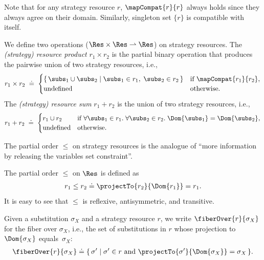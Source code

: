 Note that for any strategy resource $r$, $\mapCompat{r}{r}$ always holds since they always agree on their domain. Similarly, singleton set $\{r\}$ is compatible with itself.

\begin{definition}\label{def:strategy-resource-times} We define two operations ($\Res \times \Res \rightharpoonup \Res$) on strategy resources. The \emph{(strategy) resource product} $r_1 \times r_2$ is the partial binary operation that produces the pairwise union of two strategy resources, i.e.,
  \[
    r_1 \times r_2 \;\doteq\;
    \begin{cases}
      \{\, \subs_1 \cup \subs_2 \mid \subs_1 \in r_1,\; \subs_2 \in r_2 \,\}
        & \text{if } \mapCompat{r_1}{r_2}, \\
      \text{undefined}
        & \text{otherwise.}
    \end{cases}
  \]
The \emph{(strategy) resource sum} $r_1 + r_2$ is the union of two strategy resources, i.e.,
\[
  r_1 + r_2 \;\doteq\;
  \begin{cases}
    r_1 \cup r_2
      & \text{if } \forall \subs_1 \in r_1.\; \forall \subs_2 \in r_2.\; \Dom{\subs_1} = \Dom{\subs_2}, \\
    \text{undefined}
      & \text{otherwise.}
  \end{cases}
\]
  \end{definition}

The partial order $\leq$ on strategy resources is the analogue of ``more information by releasing the variables set constraint''.

\begin{definition}\label{def:partial-order} The partial order $\leq$ on $\Res$ is defined as 
    \begin{align*}
      r_1 \leq r_2 \doteq \projectTo{r_2}{\Dom{r_1}} = r_1.
    \end{align*}
It is easy to see that $\leq$ is reflexive, antisymmetric, and transitive.
\end{definition}

\begin{definition}\label{def:strategy-resource-fiber}
  Given a substitution $\sigma_X$ and a strategy resource $r$, we write $\fiberOver{r}{\sigma_X}$ for the fiber over $\sigma_X$, i.e., the set of substitutions in $r$ whose projection to $\Dom{\sigma_X}$ equals~$\sigma_X$:
  \begin{align*}
    \fiberOver{r}{\sigma_X} \doteq \{\, \sigma' \mid \sigma' \in r \text{ and } \projectTo{\sigma'}{\Dom{\sigma_X}} = \sigma_X \,\}.
  \end{align*}
\end{definition}

